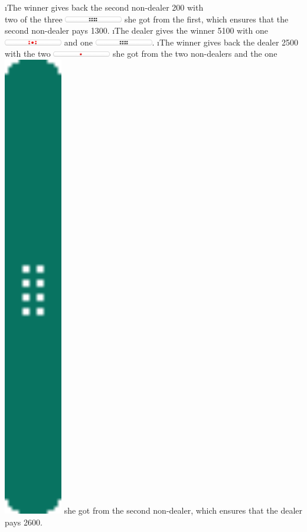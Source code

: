 \i The winner gives back the second non-dealer 200 with\\
two of the three \includegraphics[width=1in]{figs/tenbou100} she got from the first,
which ensures that the second non-dealer pays 1300.
\i The dealer gives the winner 5100 with one \includegraphics[width=1in]{figs/tenbou5000} and one \includegraphics[width=1in]{figs/tenbou100}.
\i The winner gives back the dealer 2500 with the two \includegraphics[width=1in]{figs/tenbou1000} she got from the two non-dealers and the one \includegraphics[width=1in]{figs/tenbou500} she got from the second non-dealer, which ensures that the dealer pays 2600.
